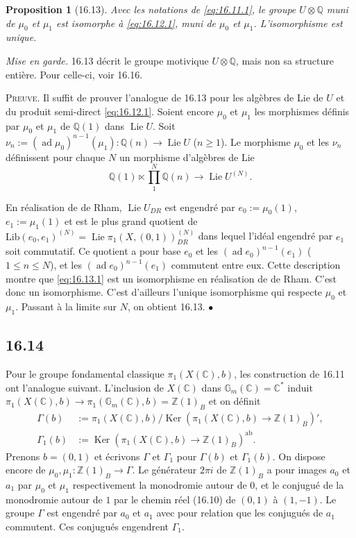 \documentclass[12pt,a4paper]{article}
\theoremstyle{plain}
\newtheorem{proposition}[theorem]{Proposition}
\theoremstyle{definition}
\theoremstyle{remark}
\DeclareMathOperator{\Ker}{Ker}
\DeclareMathOperator{\Lie}{Lie}
\DeclareMathOperator{\ad}{ad}
\newcommand{\Betti}{B}
\newcommand{\dR}{DR}
\newcommand{\Gm}{\mathbb{G}_m}
\newcommand{\ZZ}{\mathbb{Z}}
\newcommand{\QQ}{\mathbb{Q}}
\newcommand{\CC}{\mathbb{C}}
\begin{document}
\begin{proposition}[16.13]\label{prop:16.13}
Avec les notations de \ref{eq:16.11.1}, le groupe $U \otimes \QQ$ muni de
$\mu_0$ et $\mu_1$ est isomorphe \`a \eqref{eq:16.12.1}, muni de $\mu_0$ et
$\mu_1$. L'isomorphisme est unique.
\end{proposition}

\noindent \textit{Mise en garde.} 16.13 d\'ecrit le groupe motivique
$U \otimes \QQ$, mais non sa structure enti\`ere. Pour celle-ci, voir 16.16.

\noindent \textsc{Preuve.} Il suffit de prouver l'analogue de 16.13 pour
les alg\`ebres de Lie de $U$ et du produit semi-direct
\eqref{eq:16.12.1}. Soient encore $\mu_0$ et $\mu_1$ les morphismes
d\'efinis par $\mu_0$ et $\mu_1$ de $\QQ(1)$ dans $\Lie U$. Soit
$\nu_n := (\ad\mu_0)^{n-1}(\mu_1) : \QQ(n) \to \Lie U$ ($n \geq 1$). Le
morphisme $\mu_0$ et les $\nu_n$ d\'efinissent pour chaque $N$ un morphisme
d'alg\`ebres de Lie
\begin{equation}\label{eq:16.13.1}
\QQ(1) \ltimes \prod_1^N \QQ(n) \to \Lie U^{(N)}.
\end{equation}

En r\'ealisation de de Rham, $\Lie U_{\dR}$ est engendr\'e par
$e_0 := \mu_0(1)$, $e_1 := \mu_1(1)$ et est le plus grand quotient de
$\mathrm{Lib}(e_0,e_1)^{(N)} = \Lie \pi_1(X,(0,1))_{\dR}^{(N)}$ dans lequel
l'id\'eal engendr\'e par $e_1$ soit commutatif. Ce quotient a pour base
$e_0$ et les $(\ad e_0)^{n-1}(e_1)$ ($1 \leq n \leq N$), et les
$(\ad e_0)^{n-1}(e_1)$ commutent entre eux. Cette description montre que
\eqref{eq:16.13.1} est un isomorphisme en r\'ealisation de de Rham.
C'est donc un isomorphisme. C'est d'ailleurs l'unique isomorphisme qui
respecte $\mu_0$ et $\mu_1$. Passant \`a la limite sur $N$, on obtient
16.13. \hfill $\bullet$

\subsection*{16.14}

Pour le groupe fondamental classique $\pi_1(X(\CC),b)$, les construction de
16.11 ont l'analogue suivant. L'inclusion de $X(\CC)$ dans
$\Gm(\CC) = \CC^*$ induit
$\pi_1(X(\CC),b) \to \pi_1(\Gm(\CC),b) = \ZZ(1)_\Betti$ et on d\'efinit
\begin{align*}
\Gamma(b) &:= \pi_1(X(\CC),b)/\Ker(\pi_1(X(\CC),b) \to \ZZ(1)_\Betti)', \\
\Gamma_1(b) &:= \Ker(\pi_1(X(\CC),b) \to \ZZ(1)_\Betti)^{\mathrm{ab}}.
\end{align*}
Prenons $b = (0,1)$ et \'ecrivons $\Gamma$ et $\Gamma_1$ pour $\Gamma(b)$ et
$\Gamma_1(b)$. On dispose encore de $\mu_0, \mu_1 : \ZZ(1)_\Betti \to \Gamma$.
Le g\'en\'erateur $2\pi i$ de $\ZZ(1)_\Betti$ a pour images $a_0$ et $a_1$ par
$\mu_0$ et $\mu_1$ respectivement la monodromie autour de $0$, et le
conjugu\'e de la monodromie autour de $1$ par le chemin r\'eel (16.10) de
$(0,1)$ \`a $(1,-1)$. Le groupe $\Gamma$ est engendr\'e par $a_0$ et $a_1$
avec pour relation que les conjugu\'es de $a_1$ commutent. Ces conjugu\'es
engendrent $\Gamma_1$.
\end{document}
